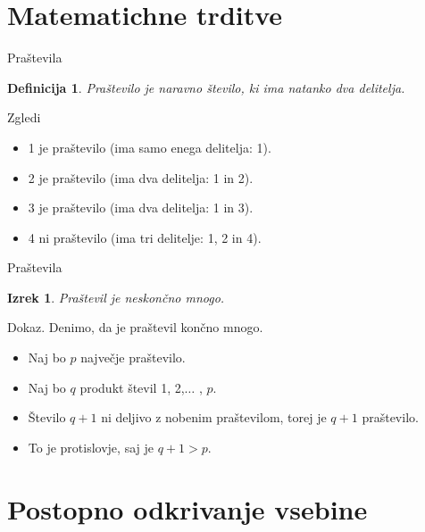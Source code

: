 \documentclass{beamer}
\newtheorem{definicija}{Definicija}
\newtheorem{izrek}{Izrek}
\begin{document}
\section{Matematichne trditve}


   \begin{frame}{Praštevila}
      \begin{definicija}
      Praštevilo je naravno število, ki ima natanko dva delitelja.
      \end{definicija}
      \begin{exampleblock}{Zgledi}
         \begin {itemize}
         \item 1 je praštevilo (ima samo enega delitelja: 1).
         \item 2 je praštevilo (ima dva delitelja: 1 in 2).
         \item 3 je praštevilo (ima dva delitelja: 1 in 3).
         \item 4 ni praštevilo (ima tri delitelje: 1, 2 in 4).
      \end{itemize}
      \end{exampleblock}
   \end{frame}
\begin{frame}{Praštevila}
   \begin{izrek}
      Praštevil je neskončno mnogo.
   \end{izrek}
\begin{block}{Dokaz.}
      Denimo, da je praštevil končno mnogo.
      \begin{itemize}
      \item Naj bo $p$ največje praštevilo.
      \item Naj bo $q$ produkt števil 1, 2,$\dots$ , $p$.
      \item Število $q+1$ ni deljivo z nobenim praštevilom, torej je $q+1$ praštevilo.
      \item To je protislovje, saj je $q+1>p$.
      \end{itemize}
      \end{block}
   
   \end{frame}

\section{Postopno odkrivanje vsebine}
\end{document}
